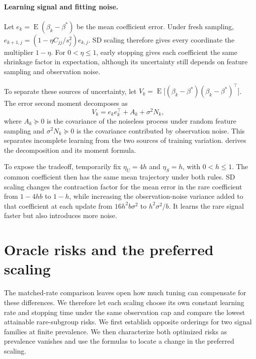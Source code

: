 \documentclass{alt2027}
\DeclareMathOperator{\E}{E}
\begin{document}
\paragraph{Learning signal and fitting noise.}

Let $e_k = \E(\beta_k - \beta^*)$ be the mean coefficient error. Under fresh
sampling, $e_{k+1,j} = (1 - \eta C_{jj}/s_j^2)e_{k,j}$. SD scaling therefore
gives every coordinate the multiplier $1 - \eta$. For $0 < \eta \leq 1$, early
stopping gives each coefficient the same shrinkage factor in expectation,
although its uncertainty still depends on feature sampling and observation
noise.

To separate these sources of uncertainty, let
$V_k = \E\bigl[(\beta_k - \beta^*)(\beta_k - \beta^*)^\top\bigr]$. The error
second moment decomposes as
\begin{equation}
  V_k = e_ke_k^\top + A_k + \sigma^2N_k, \label{eq:conference-decomposition}
\end{equation}
where $A_k \succeq 0$ is the covariance of the noiseless process under random
feature sampling and $\sigma^2N_k \succeq 0$ is the covariance contributed by
observation noise. This separates incomplete learning from the two sources of
training variation.  derives the decomposition
and its moment formula.

To expose the tradeoff, temporarily fix $\eta_U = 4h$ and $\eta_S = h$, with
$0 < h \leq 1$. The common coefficient then has the same mean trajectory under
both rules. SD scaling changes the contraction factor for the mean error in the
rare coefficient from $1 - 4hb$ to $1 - h$, while increasing the
observation-noise variance added to that coefficient at each update from
$16h^2b\sigma^2$ to $h^2\sigma^2/b$. It learns the rare signal faster but also
introduces more noise.

\section{Oracle risks and the preferred scaling}

The matched-rate comparison leaves open how much tuning can compensate for these
differences. We therefore let each scaling choose its own constant learning rate
and stopping time under the same observation cap and compare the lowest
attainable rare-subgroup risks. We first establish opposite orderings for two
signal families at finite prevalence. We then characterize both optimized risks
as prevalence vanishes and use the formulas to locate a change in the preferred
scaling.
\end{document}
